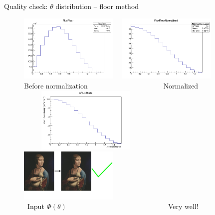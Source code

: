 \documentclass{beamer}
\begin{document}
\begin{frame}{Quality check: $\theta$ distribution -- floor method}
\begin{figure}
\includegraphics[width=0.42\textwidth]{images/FluxFloor.png}~~
\includegraphics[width=0.42\textwidth]{images/FluxFLoorNormalized.png}\\
Before normalization~~~~~~~~~~~~~~~~~~~~~ Normalized~~~~~\\
~~~~~\includegraphics[width=0.42\textwidth]{images/uFLuxTheta.png}
~~~~~~~\includegraphics[width=0.42\textwidth]{images/Lady_with_an_Ermine_good.jpg}\\
~Input $\Phi(\theta)$~~~~~~~~~~~~~~~~~~~~~~~~~~~~~Very well!
\end{figure}
\end{frame}
\end{document}
